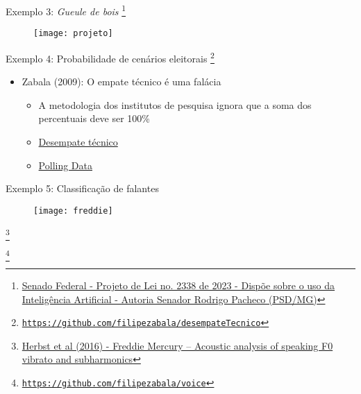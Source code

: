 \documentclass{beamer}
\newcommand\blfootnote[1]{%
  \begingroup
  \renewcommand\thefootnote{}\footnote{#1}%
  \addtocounter{footnote}{-1}%
  \endgroup
}
\begin{document}
\begin{frame}{Exemplo 3: \textit{Gueule de bois}}
\blfootnote{\tiny{\href{https://legis.senado.leg.br/sdleg-getter/documento?dm=9347622&ts=1720207595029&disposition=inline}{Senado Federal - Projeto de Lei no. 2338 de 2023 - Dispõe sobre o uso da Inteligência Artificial - Autoria Senador Rodrigo Pacheco (PSD/MG)}}}
\begin{figure}
\texttt{[image: projeto]}
\end{figure}
\end{frame}

\begin{frame}{Exemplo 4: Probabilidade de cenários eleitorais}
\blfootnote{\tiny{\href{https://github.com/filipezabala/desempateTecnico}{\nolinkurl{https://github.com/filipezabala/desempateTecnico}}}}
\begin{itemize}
\item Zabala (2009): O empate técnico é uma falácia
  \begin{itemize}
  \pause
  \item A metodologia dos institutos de pesquisa ignora que a soma dos percentuais deve ser 100\%
  \pause
  \item \href{http://www.filipezabala.com/cursos/dt.html}{Desempate técnico}
  \pause
  \item \href{http://www.pollingdata.com.br/}{Polling Data}
  \end{itemize}
\end{itemize}
\end{frame}

\begin{frame}{Exemplo 5: Classificação de falantes}
\begin{figure}
\texttt{[image: freddie]}
\end{figure}
\blfootnote{\tiny{\href{https://www.tandfonline.com/doi/abs/10.3109/14015439.2016.1156737}{Herbst et al (2016) - Freddie Mercury – Acoustic analysis of speaking F0 vibrato and subharmonics}}}
\blfootnote{\tiny{\href{https://github.com/filipezabala/voice}{\nolinkurl{https://github.com/filipezabala/voice}}}}
\end{frame}
\end{document}
